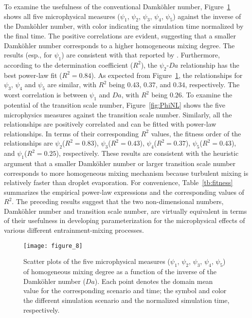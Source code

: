 \documentclass[draft,linenumbers]{agujournal}
\newcommand{\Fig}[1]{Figure~\ref{#1}}
\newcommand{\Table}[1]{Table~\ref{#1}}
\begin{document}
To examine the usefulness of the conventional Damk\"{o}hler number, 
\Fig{fig:PhiDa} shows all five microphysical measures ($\psi_1$, $\psi_2$, $\psi_3$, $\psi_4$, $\psi_5$) against the inverse of the Damk\"{o}hler number, with color indicating the simulation time normalized by the final time. The positive correlations are evident, suggesting that a smaller Damk\"{o}hler number corresponds to a higher homogeneous mixing degree. The results (esp., for $\psi_1$) are consistent with that reported by \citet{And09}. Furthermore, according to the determination coefficient ($R^2$), the $\psi_2$-$Da$ relationship has the best power-law fit ($R^2 = 0.84$). As expected from \Fig{fig:PhiDa}, the relationships for $\psi_3$, $\psi_4$ and $\psi_5$ are similar, with $R^2$ being $0.43$, $0.37$, and $0.34$, respectively. The worst correlation is between $\psi_1$ and $Da$, with $R^2$ being $0.26$. To examine the potential of the transition scale number, \Fig{fig:PhiNL} shows the five microphysics measures against the transition scale number. Similarly, all the relationships are positively correlated and can be fitted with power-law relationships. In terms of their corresponding $R^2$ values, the fitness order of the relationships are $\psi_2$($R^2 = 0.83$), $\psi_3$($R^2 = 0.43$), $\psi_4$($R^2=0.37$), $\psi_5$($R^2=0.43$), and $\psi_1$($R^2 = 0.25$), respectively. These results are consistent with the heuristic argument that { a smaller Damk\"{o}hler number or larger transition scale number corresponds to more homogeneous mixing mechanism because turbulent mixing is relatively faster than droplet evaporation. For convenience, \Table{tb:fitness} summarizes the empirical power-law expressions and the corresponding values of $R^2$. The preceding results suggest that the two non-dimensional numbers, Damk\"{o}hler number and transition scale number, are virtually equivalent in terms of their usefulness in developing parameterization for the microphysical effects of various different entrainment-mixing processes.}

\begin{figure}[!htbp]\centering
\texttt{[image: figure\_8]}
\caption{Scatter plots of the five microphysical measures ($\psi_1$, $\psi_2$, $\psi_3$, $\psi_4$, $\psi_5$) of homogeneous mixing degree as a function of the inverse of the Damk\"ohler number ($Da$). Each point denotes the domain mean value for the corresponding scenario and time; the symbol and color the different simulation scenario and the normalized simulation time, respectively.\label{fig:PhiDa}}
\end{figure}
\end{document}
